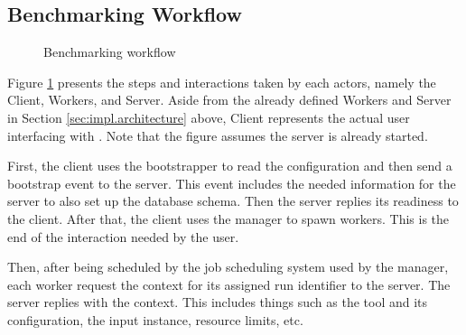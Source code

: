 \subsection{Benchmarking Workflow}
\begin{figure}
    \centering
    \caption{Benchmarking workflow}
    \label{fig:swimlane}
\end{figure}

Figure \ref{fig:swimlane} presents the steps and interactions taken by each actors, namely the Client, Workers, and Server.
Aside from the already defined Workers and Server in Section \ref{sec:impl.architecture} above, Client represents the actual user interfacing with \OurBenchmarkingTool.
Note that the figure assumes the server is already started.

First, the client uses the bootstrapper to read the configuration and then send a bootstrap event to the server.
This event includes the needed information for the server to also set up the database schema.
Then the server replies its readiness to the client.
After that, the client uses the manager to spawn workers.
This is the end of the interaction needed by the user.

Then, after being scheduled by the job scheduling system used by the manager, each worker request the context for its assigned run identifier to the server.
The server replies with the context.
This includes things such as the tool and its configuration, the input instance, resource limits, etc.


